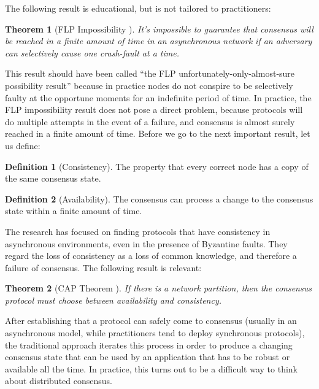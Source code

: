 \documentclass[11pt,a4paper]{article}
\theoremstyle{plain}
\newtheorem{thm}{Theorem}
\theoremstyle{definition}
\newtheorem{defn}{Definition}
\begin{document}
The following result is educational, but is not tailored to practitioners:

\begin{thm}[FLP Impossibility \cite{FLP}]
It's impossible to guarantee that consensus will be reached in a finite amount of time in an asynchronous network if an adversary can selectively cause one crash-fault at a time.
\end{thm}

This result should have been called ``the FLP unfortunately-only-almost-sure possibility result'' because in practice nodes do not conspire to be selectively faulty at the opportune moments for an indefinite period of time. In practice, the FLP impossibility result does not pose a direct problem, because protocols will do multiple attempts in the event of a failure, and consensus is almost surely reached in a finite amount of time. Before we go to the next important result, let us define:

\begin{defn}[Consistency]
The property that every correct node has a copy of the same consensus state.
\end{defn}

\begin{defn}[Availability]
The consensus can process a change to the consensus state within a finite amount of time.
\end{defn}

The research has focused on finding protocols that have consistency in asynchronous environments, even in the presence of Byzantine faults. They regard the loss of consistency as a loss of common knowledge, and therefore a failure of consensus. The following result is relevant:

\begin{thm}[CAP Theorem \cite{CAP}]
If there is a network partition, then the consensus protocol must choose between availability and consistency.
\end{thm}

After establishing that a protocol can safely come to consensus (usually in an asynchronous model, while practitioners tend to deploy synchronous protocols), the traditional approach iterates this process in order to produce a changing consensus state that can be used by an application that has to be robust or available all the time. In practice, this turns out to be a difficult way to think about distributed consensus.
\end{document}
